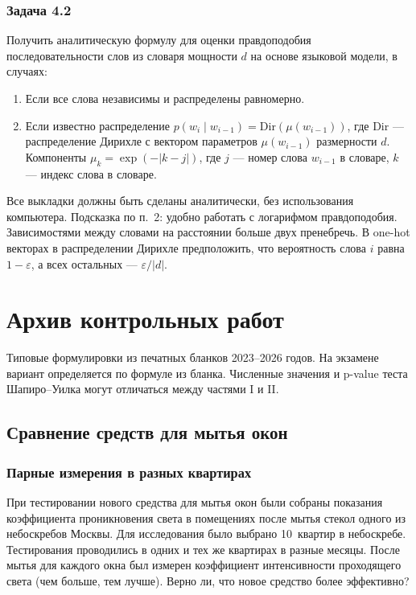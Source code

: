 \subsubsection{Задача 4.2}

Получить аналитическую формулу для оценки правдоподобия последовательности слов из словаря мощности $d$ на основе языковой модели, в случаях:
\begin{enumerate}
    \item Если все слова независимы и распределены равномерно.
    \item Если известно распределение $p(w_i\mid w_{i-1})=\mathrm{Dir}(\mu(w_{i-1}))$, где $\mathrm{Dir}$ --- распределение Дирихле с вектором параметров $\mu(w_{i-1})$ размерности $d$. Компоненты $\mu_k=\exp(-|k-j|)$, где $j$ --- номер слова $w_{i-1}$ в словаре, $k$ --- индекс слова в словаре.
\end{enumerate}
Все выкладки должны быть сделаны аналитически, без использования компьютера.
Подсказка по п.~2: удобно работать с логарифмом правдоподобия. Зависимостями между словами на расстоянии больше двух пренебречь. В one-hot векторах в распределении Дирихле предположить, что вероятность слова $i$ равна $1-\varepsilon$, а всех остальных --- $\varepsilon/|d|$.
\section{Архив контрольных работ}
\label{sec:exam-tasks}

Типовые формулировки из печатных бланков 2023--2026 годов. На экзамене вариант определяется по формуле из бланка. Численные значения и p-value теста Шапиро--Уилка могут отличаться между частями I и II.

\subsection{Сравнение средств для мытья окон}

\subsubsection{Парные измерения в разных квартирах}

При тестировании нового средства для мытья окон были собраны показания коэффициента проникновения света в помещениях после мытья стекол одного из небоскребов Москвы. Для исследования было выбрано 10~квартир в небоскребе. Тестирования проводились в одних и тех же квартирах в разные месяцы. После мытья для каждого окна был измерен коэффициент интенсивности проходящего света (чем больше, тем лучше). Верно ли, что новое средство более эффективно?

